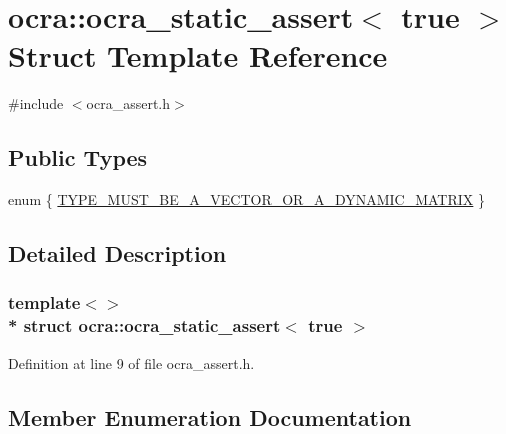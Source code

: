 \hypertarget{structocra_1_1ocra__static__assert_3_01true_01_4}{}\section{ocra\+:\+:ocra\+\_\+static\+\_\+assert$<$ true $>$ Struct Template Reference}
\label{structocra_1_1ocra__static__assert_3_01true_01_4}


{\ttfamily \#include $<$ocra\+\_\+assert.\+h$>$}

\subsection*{Public Types}
\begin{DoxyCompactItemize}
\item 
enum \{ \hyperlink{structocra_1_1ocra__static__assert_3_01true_01_4_a657a92b86d7c5d6a5b57db940b4dfb2da6c7e0005ce412fea00fe630cfeef49cc}{T\+Y\+P\+E\+\_\+\+M\+U\+S\+T\+\_\+\+B\+E\+\_\+\+A\+\_\+\+V\+E\+C\+T\+O\+R\+\_\+\+O\+R\+\_\+\+A\+\_\+\+D\+Y\+N\+A\+M\+I\+C\+\_\+\+M\+A\+T\+R\+IX}
 \}
\end{DoxyCompactItemize}


\subsection{Detailed Description}
\subsubsection*{template$<$$>$\\*
struct ocra\+::ocra\+\_\+static\+\_\+assert$<$ true $>$}



Definition at line 9 of file ocra\+\_\+assert.\+h.



\subsection{Member Enumeration Documentation}
